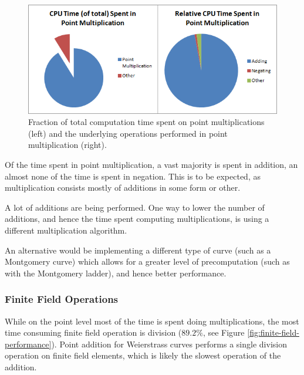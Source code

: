 \begin{figure}[htb!]
	\centering
	\includegraphics[width=1\textwidth]{performance/point-multiplication--relative-time}
	\caption{Fraction of total computation time spent on point multiplications (left) and the underlying operations performed in point
		multiplication (right).}
	\label{fig:point-multiplication-performance}
\end{figure}

Of the time spent in point multiplication, a vast majority is spent in addition, an almost none of the time is spent in negation. This
is to be expected, as multiplication consists mostly of additions in some form or other.

A lot of additions are being performed. One way to lower the number of additions, and hence the time spent computing multiplications, is
using a different multiplication algorithm.

An alternative would be implementing a different type of curve (such as a Montgomery curve) which allows for a greater level of precomputation
(such as with the Montgomery ladder), and hence better performance.

\subsubsection{Finite Field Operations}
\label{sec:performance_components_finitefield}

While on the point level most of the time is spent doing multiplications, the most time consuming finite field operation is division
(\(89.2\%\), see Figure \ref{fig:finite-field-performance}). Point addition for Weierstrass curves performs a single division operation
on finite field elements, which is likely the slowest operation of the addition.

